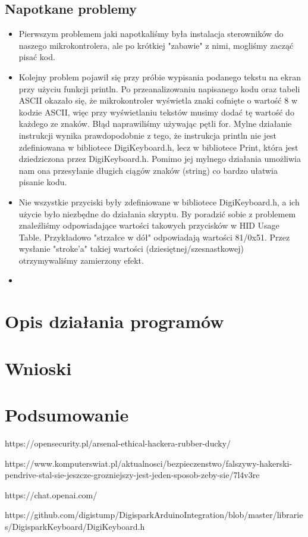 \documentclass{article}
\begin{document}
\subsection{Napotkane problemy}
\begin{itemize}
    \item Pierwszym problemem jaki napotkaliśmy była instalacja sterowników do naszego mikrokontrolera, ale po krótkiej "zabawie" z nimi, mogliśmy zacząć pisać kod. 
    \item Kolejny problem pojawił się przy próbie wypisania podanego tekstu na ekran przy użyciu funkcji println. Po przeanalizowaniu napisanego kodu oraz tabeli ASCII okazało się, że mikrokontroler wyświetla znaki cofnięte o wartość 8 w kodzie ASCII, więc przy wyświetlaniu tekstów musimy dodać tę wartość do każdego ze znaków. Błąd naprawiliśmy używając pętli for. Mylne działanie instrukcji wynika prawdopodobnie z tego, że instrukcja println nie jest zdefiniowana w bibliotece DigiKeyboard.h, lecz w bibliotece Print, która jest dziedziczona przez DigiKeyboard.h. Pomimo jej mylnego działania umożliwia nam ona przesyłanie długich ciągów znaków (string) co bardzo ułatwia pisanie kodu.
    \item %
Nie wszystkie przyciski były zdefiniowane w bibliotece DigiKeyboard.h, a ich użycie było niezbędne do działania skryptu. By poradzić sobie z problemem znaleźliśmy odpowiadające wartości takowych przycisków w HID Usage Table. Przykładowo "strzałce w dół" odpowiadają wartości 81/0x51. Przez wysłanie "stroke'a" takiej wartości (dziesiętnej/szesnastkowej) otrzymywaliśmy zamierzony efekt.
    \item %
\end{itemize}




\section{Opis działania programów}


\section{Wnioski}


\section{Podsumowanie}


\begin{thebibliography}{9}

  https://opensecurity.pl/arsenal-ethical-hackera-rubber-ducky/
  
 \bibitem{} https://www.komputerswiat.pl/aktualnosci/bezpieczenstwo/falszywy-hakerski-pendrive-stal-sie-jeszcze-grozniejszy-jest-jeden-sposob-zeby-sie/7l4v3re
  
 \bibitem{} https://chat.openai.com/

 \bibitem{} https://github.com/digistump/DigisparkArduinoIntegration/blob/master/libraries/DigisparkKeyboard/DigiKeyboard.h
  
\end{thebibliography}
\end{document}
